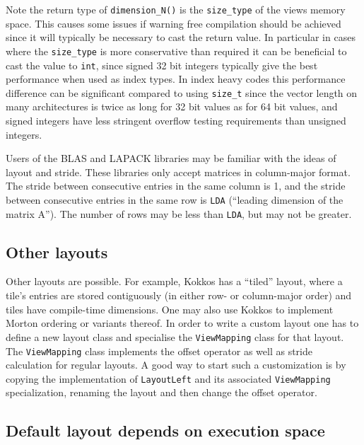 Note the return type of \lstinline|dimension_N()| is the \lstinline|size_type| of the 
views memory space. This causes some issues if warning free compilation
should be achieved since it will typically be necessary to cast the return value.
In particular in cases where the \lstinline|size_type| is more conservative than 
required it can be beneficial to cast the value to \lstinline|int|, since signed 32 bit
integers typically give the best performance when used as index types. In index heavy 
codes this performance difference can be significant compared to using \lstinline|size_t| 
since the vector length on many architectures is twice as long for 32 bit values as for
64 bit values, and signed integers have less stringent overflow testing requirements than
unsigned integers. 

Users of the BLAS and LAPACK libraries may be familiar with the ideas
of layout and stride.  These libraries only accept matrices in
column-major format.  The stride between consecutive entries in the
same column is 1, and the stride between consecutive entries in the
same row is \lstinline!LDA! (``leading dimension of the matrix A'').  The
number of rows may be less than \lstinline!LDA!, but may not be greater.

\subsection{Other layouts}\label{SS:View::Layout::Other}

Other layouts are possible.  For example, Kokkos has a ``tiled''
layout, where a tile's entries are stored contiguously (in either row-
or column-major order) and tiles have compile-time dimensions.  One
may also use Kokkos to implement Morton ordering or variants thereof.
In order to write a custom layout one has to define a new layout class and
specialise the \lstinline|ViewMapping| class for that layout. 
The \lstinline|ViewMapping| class implements the offset operator as well
as stride calculation for regular layouts. 
A good way to start such a customization is by copying the implementation of 
\lstinline|LayoutLeft| and its associated \lstinline|ViewMapping| specialization,
renaming the layout and then change the offset operator. 

\subsection{Default layout depends on execution space}\label{SS:View:Layout:Default}

